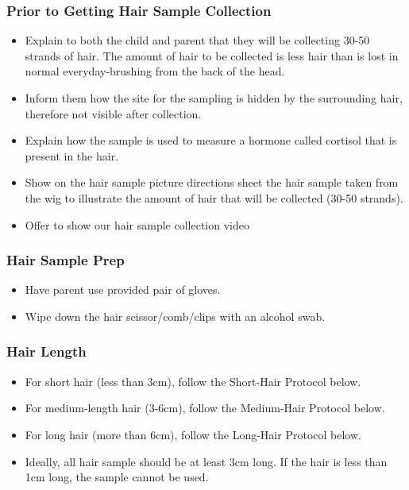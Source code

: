 \documentclass[]{book}
\providecommand{\tightlist}{%
  \setlength{\itemsep}{0pt}\setlength{\parskip}{0pt}}
\begin{document}
\hypertarget{prior-to-getting-hair-sample-collection}{%
\subsubsection{Prior to Getting Hair Sample Collection}\label{prior-to-getting-hair-sample-collection}}

\begin{itemize}
\tightlist
\item
  Explain to both the child and parent that they will be collecting 30-50 strands of hair. The amount of hair to be collected is less hair than is lost in normal everyday-brushing from the back of the head.
\item
  Inform them how the site for the sampling is hidden by the surrounding hair, therefore not visible after collection.
\item
  Explain how the sample is used to measure a hormone called cortisol that is present in the hair.
\item
  Show on the hair sample picture directions sheet the hair sample taken from the wig to illustrate the amount of hair that will be collected (30-50 strands).
\item
  Offer to show our hair sample collection video
\end{itemize}

\hypertarget{hair-sample-prep}{%
\subsubsection{Hair Sample Prep}\label{hair-sample-prep}}

\begin{itemize}
\tightlist
\item
  Have parent use provided pair of gloves.
\item
  Wipe down the hair scissor/comb/clips with an alcohol swab.
\end{itemize}

\hypertarget{hair-length}{%
\subsubsection{Hair Length}\label{hair-length}}

\begin{itemize}
\tightlist
\item
  For short hair (less than 3cm), follow the Short-Hair Protocol below.
\item
  For medium-length hair (3-6cm), follow the Medium-Hair Protocol below.
\item
  For long hair (more than 6cm), follow the Long-Hair Protocol below.
\item
  Ideally, all hair sample should be at least 3cm long. If the hair is less than 1cm long, the sample cannot be used.
\end{itemize}
\end{document}

